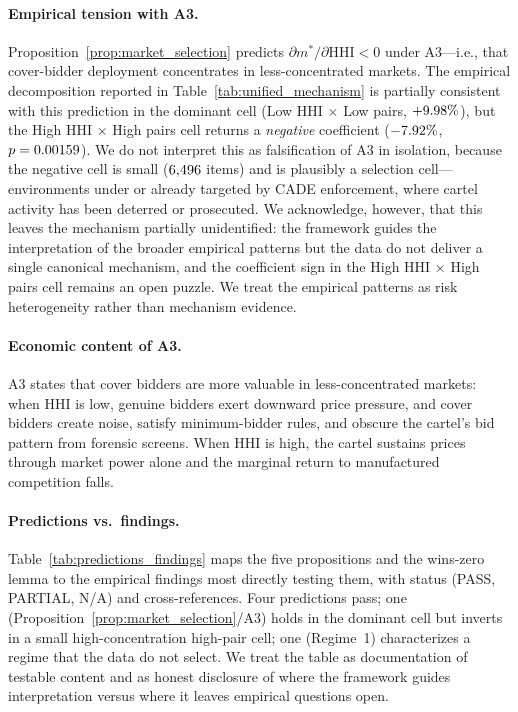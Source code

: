\paragraph{Empirical tension with A3.}
Proposition~\ref{prop:market_selection} predicts
$\partial m^*/\partial \mathrm{HHI} < 0$ under A3---i.e., that
cover-bidder deployment concentrates in less-concentrated
markets. The empirical decomposition reported in
Table~\ref{tab:unified_mechanism} is partially consistent with
this prediction in the dominant cell (Low HHI $\times$ Low pairs,
$+9.98\%$), but the High HHI $\times$ High pairs
cell returns a \emph{negative} coefficient
($-7.92\%$, $p=0.00159$).
We do not interpret this as falsification of A3 in isolation,
because the negative cell is small ($6{,}496$ items) and is
plausibly a selection cell---environments under or already
targeted by CADE enforcement, where cartel activity has been
deterred or prosecuted. We acknowledge, however, that this
leaves the mechanism partially unidentified: the framework
guides the interpretation of the broader empirical patterns
but the data do not deliver a single canonical mechanism, and
the coefficient sign in the High HHI $\times$ High pairs cell
remains an open puzzle. We treat the empirical patterns as
risk heterogeneity rather than mechanism evidence.

\paragraph{Economic content of A3.}
A3 states that cover bidders are more valuable in less-concentrated
markets: when $\mathrm{HHI}$ is low, genuine bidders exert
downward price pressure, and cover bidders create noise, satisfy
minimum-bidder rules, and obscure the cartel's bid pattern from
forensic screens. When $\mathrm{HHI}$ is high, the cartel sustains
prices through market power alone and the marginal return to
manufactured competition falls.

\paragraph{Predictions vs.\ findings.}
Table~\ref{tab:predictions_findings} maps the five propositions
and the wins-zero lemma to the empirical findings most directly
testing them, with status (PASS, PARTIAL, N/A) and
cross-references. Four predictions pass; one
(Proposition~\ref{prop:market_selection}/A3) holds in the
dominant cell but inverts in a small high-concentration
high-pair cell; one (Regime~1) characterizes a regime that the
data do not select. We treat the table as documentation of
testable content and as honest disclosure of where the
framework guides interpretation versus where it leaves
empirical questions open.

